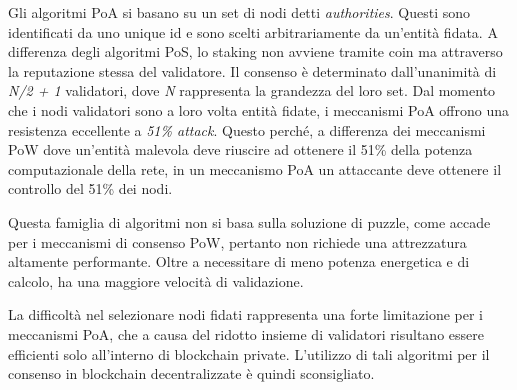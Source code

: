 Gli algoritmi PoA si basano su un set di nodi detti \textit{authorities}.
Questi sono identificati da uno unique id e sono scelti arbitrariamente da un'entità fidata. A differenza degli algoritmi PoS, lo staking non avviene tramite coin ma attraverso la reputazione stessa del validatore.
Il consenso è determinato dall'unanimità di \textit{N/2 + 1} validatori, dove \textit{N} rappresenta la grandezza del loro set.
Dal momento che i nodi validatori sono a loro volta entità fidate, i meccanismi PoA offrono una resistenza eccellente a \textit{51\% attack}. 
Questo perché, a differenza dei meccanismi PoW dove un'entità malevola deve riuscire ad ottenere il 51\% della potenza computazionale della rete, in un meccanismo PoA un attaccante deve ottenere il controllo del 51\% dei nodi. \cite{51_attack_PoA} 

Questa famiglia di algoritmi non si basa sulla soluzione di puzzle, come accade per i meccanismi di consenso PoW, pertanto non richiede una attrezzatura altamente performante. Oltre a necessitare di meno potenza energetica e di calcolo, ha una maggiore velocità di validazione. \cite{51_attack_PoA}

La difficoltà nel selezionare nodi fidati rappresenta una forte limitazione per i meccanismi PoA, che a causa del ridotto insieme di validatori risultano essere efficienti solo all'interno di blockchain private. L'utilizzo di tali algoritmi per il consenso in blockchain decentralizzate è quindi sconsigliato.

